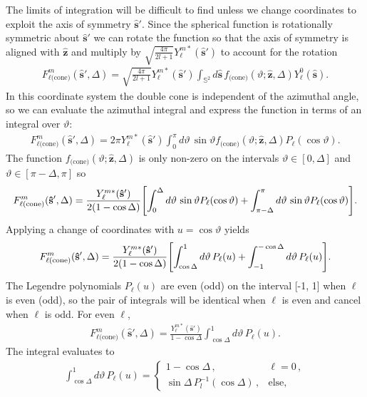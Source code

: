 \documentclass[]{osa-article}
\let\originalleft\left
\let\originalright\right
\renewcommand{\left}{\mathopen{}\mathclose\bgroup\originalleft}
\renewcommand{\right}{\aftergroup\egroup\originalright}
\providecommand{\mh}[1]{\mathbf{\hat{#1}}}
\providecommand{\mbb}[1]{\mathbb{#1}}
\begin{document}
The limits of integration will be difficult to find unless we change coordinates
to exploit the axis of symmetry $\mh{s}'$. Since the spherical function is
rotationally symmetric about $\mh{s}'$ we can rotate the function so that the axis of
symmetry is aligned with $\mh{z}$ and multiply by $\sqrt{\frac{4\pi}{2l+1}}Y_\ell^{m*}(\mh{s}')$ to account for the rotation \cite{ramamoorthi2005}
\begin{align}
    F_{\ell\text{(cone)}}^m(\mh{s}', \Delta) = \sqrt{\frac{4\pi}{2l+1}}Y_\ell^{m*}(\mh{s}')\int_{\mbb{S}^2}d\mh{s}\, f_{\text{(cone)}}(\vartheta; \mh{z}, \Delta)Y_\ell^0(\mh{s}). 
\end{align}
In this coordinate system the double cone is independent of the azimuthal angle,
so we can evaluate the azimuthal integral and express the function in terms of an
integral over $\vartheta$:
\begin{align}
    F_{\ell\text{(cone)}}^m(\mh{s}', \Delta) = 2\pi Y_\ell^{m*}(\mh{s}')\int_{0}^\pi d\vartheta\, \sin\vartheta f_{\text{(cone)}}(\vartheta; \mh{z}, \Delta)P_\ell(\cos\vartheta). 
\end{align}
The function $f_{\text{(cone)}}(\vartheta; \mh{z}, \Delta)$ is only non-zero on
the intervals $\vartheta \in [0, \Delta]$ and
$\vartheta \in [\pi - \Delta, \pi]$ so
\begin{align}
    F_{\ell\text{(cone)}}^m(\mh{s}', \Delta) = \frac{Y_\ell^{m*}(\mh{s}')}{2(1 - \cos\Delta)}\left[\int_{0}^\Delta d\vartheta\, \sin\vartheta P_\ell(\cos\vartheta) + \int_{\pi - \Delta}^\pi d\vartheta\, \sin\vartheta P_\ell(\cos\vartheta)\right]. 
\end{align}
Applying a change of coordinates with $u = \cos\vartheta$ yields
\begin{align}
    F_{\ell\text{(cone)}}^m(\mh{s}', \Delta) = \frac{Y_\ell^{m*}(\mh{s}')}{2(1 - \cos\Delta)}\left[\int_{\cos\Delta}^1 d\vartheta\, P_\ell(u) + \int_{-1}^{-\cos\Delta} d\vartheta\, P_\ell(u)\right]. 
\end{align}
The Legendre polynomials $P_\ell(u)$ are even (odd) on the interval [-1, 1] when
$\ell$ is even (odd), so the pair of integrals will be identical when $\ell$ is
even and cancel when $\ell$ is odd. For even $\ell$,
\begin{align}
  F_{\ell\text{(cone)}}^m(\mh{s}', \Delta) = \frac{Y_\ell^{m*}(\mh{s}')}{1 - \cos\Delta}\int_{\cos\Delta}^1 d\vartheta\, P_\ell(u).
\end{align}
The integral evaluates to \cite[ch.~7.111]{gradshteyn2007}
\begin{align}
  \int_{\cos\Delta}^1 d\vartheta\, P_\ell(u) =
\begin{cases}
  1 - \cos\Delta\,, &\ell = 0\,,\\
  \sin\Delta\, P_l^{-1}(\cos\Delta)\,, &\text{else},
\end{cases}
\end{align}
\end{document}
